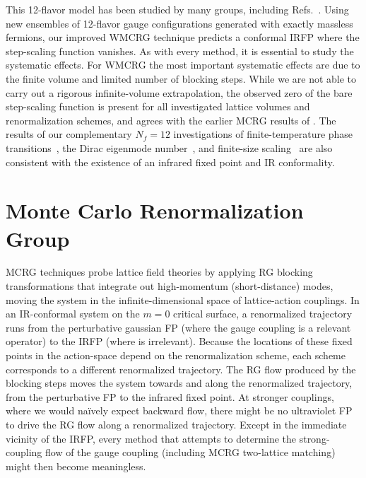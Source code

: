 This 12-flavor model has been studied by many groups, including Refs.~\cite{Appelquist:2009ty, Deuzeman:2009mh, Fodor:2011tu, Appelquist:2011dp, Hasenfratz:2011xn, DeGrand:2011cu, Cheng:2011ic, Jin:2012dw, Lin:2012iw, Aoki:2012eq, Fodor:2012uw, Fodor:2012et, Itou:2012qn, Cheng:2013eu, Aoki:2013pca, Hasenfratz:2013uha, Hasenfratz:2013eka, Cheng:2013bca}.
Using new ensembles of 12-flavor gauge configurations generated with exactly massless fermions, our improved WMCRG technique predicts a conformal IRFP where the step-scaling function vanishes.
As with every method, it is essential to study the systematic effects.
For WMCRG the most important systematic effects are due to the finite volume and limited number of blocking steps.
While we are not able to carry out a rigorous infinite-volume extrapolation, the observed zero of the bare step-scaling function is present for all investigated lattice volumes and renormalization schemes, and agrees with the earlier MCRG results of .
The results of our complementary $N_f = 12$ investigations of finite-temperature phase transitions~\cite{Schaich:2012fr, Hasenfratz:2013uha}, the Dirac eigenmode number~\cite{Cheng:2013eu, Cheng:2013bca}, and finite-size scaling~\cite{Hasenfratz:2013eka} are also consistent with the existence of an infrared fixed point and IR conformality.



\section{\label{sec:mcrg}Monte Carlo Renormalization Group} %
MCRG techniques probe lattice field theories by applying RG blocking transformations that integrate out high-momentum (short-distance) modes, moving the system in the infinite-dimensional space of lattice-action couplings.
In an IR-conformal system on the $m = 0$ critical surface, a renormalized trajectory runs from the perturbative gaussian FP (where the gauge coupling \be is a relevant operator) to the IRFP (where \be is irrelevant).
Because the locations of these fixed points in the action-space depend on the renormalization scheme, each scheme corresponds to a different renormalized trajectory.
The RG flow produced by the blocking steps moves the system towards and along the renormalized trajectory, from the perturbative FP to the infrared fixed point.
At stronger couplings, where we would na\"ively expect backward flow, there might be no ultraviolet FP to drive the RG flow along a renormalized trajectory.
Except in the immediate vicinity of the IRFP, every method that attempts to determine the strong-coupling flow of the gauge coupling (including MCRG two-lattice matching) might then become meaningless.

